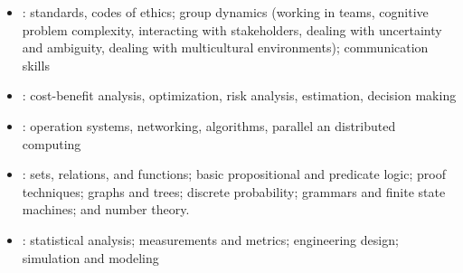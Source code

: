 \begin{minipage}[t]{0.48\linewidth}
\fi
\begin{itemize}
\item {}:  standards,
  codes of ethics; group dynamics (working in teams, cognitive problem complexity,
  interacting with stakeholders, dealing with uncertainty and ambiguity,
  dealing with multicultural environments); communication skills
\item {}: cost-benefit analysis,
  optimization, risk analysis, estimation, decision making
\end{itemize}
\ifslides
\else
\end{minipage}
\hfill
\begin{minipage}[t]{0.48\linewidth}
\fi
\begin{itemize}
\item {}: operation systems,
  networking, algorithms, parallel an distributed computing
\item {}: sets, relations, and
  functions; basic propositional and predicate logic;
  proof techniques; graphs and trees; discrete probability;
  grammars and finite state machines; and number theory.
\item {}: statistical analysis;
  measurements and metrics; engineering design; simulation and modeling
\end{itemize}
\ifslides
\newslide
\else
\end{minipage}
\fi


